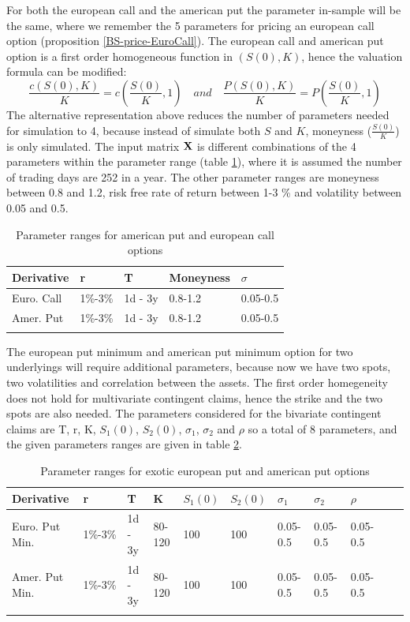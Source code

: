For both the european call and the american put the parameter in-sample will be the same, where we remember the 5 parameters for pricing an european call option (proposition \ref{BS-price-EuroCall}). The european call and american put option is a first order homogeneous function in $(S(0),K)$, hence the valuation formula can be modified:
$$\frac{c(S(0),K)}{K}=c(\frac{S(0)}{K},1) \quad and \quad \frac{P(S(0),K)}{K}=P(\frac{S(0)}{K},1)$$
The alternative representation above reduces the number of parameters needed for simulation to 4, because instead of simulate both $S$ and $K$, moneyness ($\frac{S(0)}{K}$) is only  simulated. The input matrix $\mathbf{X}$ is different combinations of the 4 parameters within the parameter range (table \ref{tab:vanillaParRange}), where it is assumed the number of trading days are 252 in a year. The other parameter ranges are moneyness between 0.8 and 1.2, risk free rate of return between 1-3 \% and volatility between 0.05 and 0.5. 

\begin{table}[H]
\caption[Parameter Ranges For MLPs]{Parameter ranges for american put and european call options}
\label{tab:vanillaParRange}
\centering
\begin{tabular}{l l l l l}
\toprule
\textbf{Derivative} & \textbf{r} & \textbf{T} & \textbf{Moneyness} & $\sigma$ \\
\midrule
Euro. Call & 1\%-3\% & 1d - 3y & 0.8-1.2 & 0.05-0.5\\ 
Amer. Put & 1\%-3\% & 1d - 3y & 0.8-1.2 & 0.05-0.5\\ 
\bottomrule\\
\end{tabular}
\end{table}

The european put minimum and american put minimum option for two underlyings will require additional parameters, because now we have two spots, two volatilities and correlation between the assets. The first order homegeneity does not hold for multivariate contingent claims, hence the strike and the two spots are also needed. The parameters considered for the bivariate contingent claims are T, r, K, $S_1(0)$, $S_2(0)$, $\sigma_1$, $\sigma_2$ and $\rho$ so a total of 8 parameters, and the given parameters ranges are given in table \ref{tab:ExoticParRange}.
   
\begin{table}[H]
\caption[Parameter Ranges For MLPs]{Parameter ranges for exotic european put and american put options}
\label{tab:ExoticParRange}
\centering
\begin{tabular}{l l l l l l l l l l l}
\toprule
\textbf{Derivative} & \textbf{r} & \textbf{T} & K & $S_1(0)$ & $S_2(0)$ & $\sigma_1$ & $\sigma_2$ & $\rho$ \\
\midrule
Euro. Put Min. & 1\%-3\% & 1d - 3y & 80-120 & 100 & 100 & 0.05-0.5 & 0.05-0.5 & 0.05-0.5\\ 
Amer. Put Min. & 1\%-3\% & 1d - 3y & 80-120 & 100 & 100 & 0.05-0.5 & 0.05-0.5 & 0.05-0.5\\
\bottomrule\\
\end{tabular}
\end{table}

